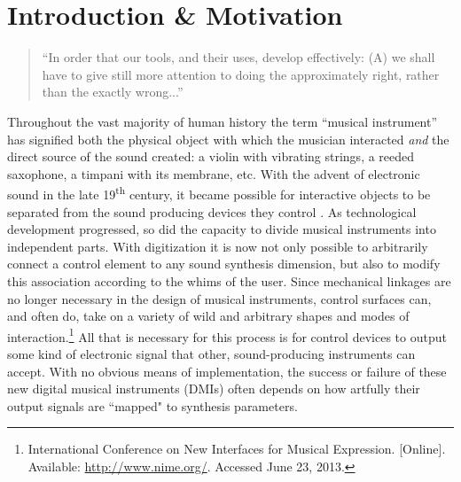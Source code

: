 
\chapter{Introduction \& Motivation}

\begin{quote}
``In order that our tools, and their uses, develop effectively: (A) we shall have to give still more attention to doing the approximately right, rather than the exactly wrong...'' \cite{tuckey}
\end{quote}

Throughout the vast majority of human history the term ``musical instrument'' has signified both the physical object with which the musician interacted \emph{and} the direct source of the sound created: a violin with vibrating strings, a reeded saxophone, a timpani with its membrane, etc.  With the advent of electronic sound in the late 19\textsuperscript{th} century, it became possible for interactive objects to be separated from the sound producing devices they control \cite{chadabe}.
As technological development progressed, so did the capacity to divide musical instruments into independent parts. With digitization it is now not only possible to arbitrarily connect a control element to any sound synthesis dimension, but also to modify this association according to the whims of the user. Since mechanical linkages are no longer necessary in the design of musical instruments, control surfaces can, and often do, take on a variety of wild and arbitrary shapes and modes of interaction.\footnote{International Conference on New Interfaces for Musical Expression. [Online]. Available: \url{http://www.nime.org/}. Accessed June 23, 2013.}
All that is necessary for this process is for control devices to output some kind of electronic signal that other, sound-producing instruments can accept. With no obvious means of implementation, the success or failure of these new digital musical instruments (DMIs) often depends on how artfully their output signals are ``mapped" to synthesis parameters.

